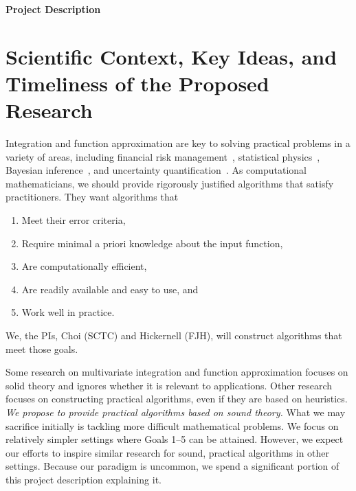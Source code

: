 \documentclass[11pt]{NSFamsart}
\begin{document}

\centerline{\Large \textbf{Project Description}}
\vspace{-2ex}

\setcounter{tocdepth}{1}
\tableofcontents

\vspace{-6ex}

\section{Scientific Context, Key Ideas, and Timeliness of the Proposed Research}

Integration and function approximation are key to
solving practical problems in a variety of areas, including financial risk management~\cite{Gla03}, 
statistical physics~\cite{LanBin14}, 
Bayesian inference~\cite{GelEtal13}, and uncertainty quantification~\cite{ForEtal09, Smi14a}.  As computational mathematicians, we should provide rigorously justified algorithms that satisfy practitioners.  They want algorithms that 
\begin{enumerate}[leftmargin = 15ex]
\renewcommand{\labelenumi}{\textbf{Goal \arabic{enumi}.}}

\item \label{GoalOne} Meet their error criteria,
    
\item \label{GoalTwo} Require minimal a priori knowledge about the input function,

\item \label{GoalThree} Are computationally efficient,

\item \label{GoalFour} Are readily available and easy to use, and

\item \label{GoalFive} Work well in practice.
\end{enumerate}
We, the PIs, Choi (SCTC) and Hickernell (FJH), will construct algorithms that meet those goals.

Some research on multivariate integration and function approximation focuses on solid theory and ignores whether it is relevant to applications.  Other research focuses on constructing practical algorithms, even if they are based on heuristics.  \emph{We propose to provide practical algorithms based on sound theory.}  What we may sacrifice initially is tackling more difficult mathematical problems.  We focus on relatively simpler settings where Goals 1--5 can be attained. However, we expect our efforts to inspire similar research for sound, practical algorithms in other settings.  Because our paradigm is uncommon, we spend a significant portion of this project description explaining it.
\end{document}
